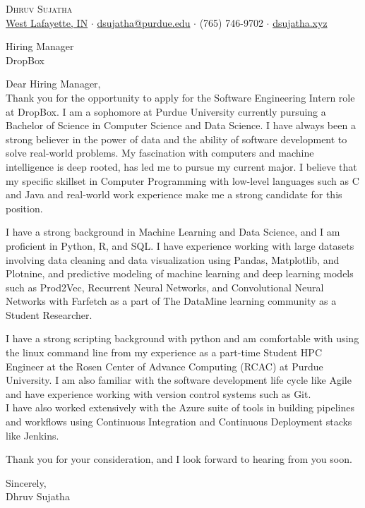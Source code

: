\documentclass[a4paper]{article}
\begin{document}
\vspace*{-40pt}

    

\vspace*{-10pt}
\begin{center}
	{\Huge \scshape {Dhruv Sujatha}}\\
	\href{https://www.google.com/maps/place/West+Lafayette,+IN/}{West Lafayette, IN} $\cdot$ \href{mailto:dsujatha@purdue.edu}{dsujatha@purdue.edu} $\cdot$ (765) 746-9702 $\cdot$ \href{https://dsujatha.xyz}{dsujatha.xyz}\\
\end{center}

\hrulefill
\fontsize{14pt}{17pt}\selectfont

\vspace*{30pt}
Hiring Manager\\
DropBox

\vspace*{30pt}

Dear Hiring Manager,\\
\vspace*{20pt}
Thank you for the opportunity to apply for the Software Engineering Intern role at DropBox. 
I am a sophomore at Purdue University currently pursuing a Bachelor of Science in Computer Science and Data Science.
I have always been a strong believer in the power of data and the ability of software development to solve real-world problems. 
My fascination with computers and machine intelligence is deep rooted, has led me to pursue my current major. 
I believe that my specific skillset in Computer Programming with low-level languages such as C and Java and real-world work experience make me a strong candidate for this position.

\vspace*{20pt}

I have a strong background in Machine Learning and Data Science, 
and I am proficient in Python, R, and SQL. I have experience working with large datasets
involving data cleaning and data visualization using Pandas, Matplotlib, and Plotnine, and predictive modeling of machine learning 
and deep learning models such as Prod2Vec, Recurrent Neural Networks, and Convolutional Neural Networks with Farfetch as a part of The DataMine learning community as a Student Researcher. \\

\vspace*{20pt}

I have a strong scripting background with python and am comfortable with using the linux command line from my experience as a part-time Student HPC Engineer 
at the Rosen Center of Advance Computing (RCAC) at Purdue University.
I am also familiar with the software development life cycle like Agile and have experience working with version control systems such as Git. \\
I have also worked extensively with the Azure suite of tools in building pipelines and workflows using Continuous Integration and Continuous Deployment stacks like Jenkins.\\

\vspace*{20pt}

Thank you for your consideration, and I look forward to hearing from you soon.

\vspace*{20pt}

Sincerely,\\
Dhruv Sujatha\\
\end{document}
